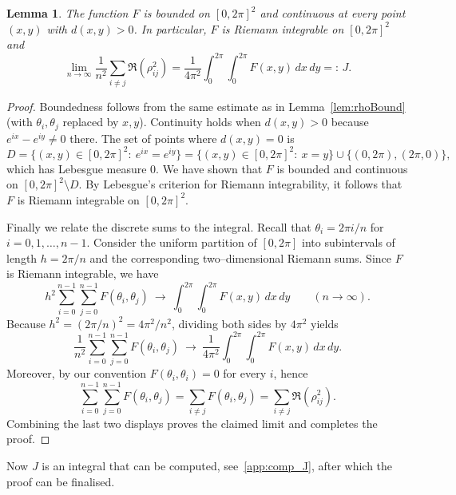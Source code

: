 \documentclass{article}
\newtheorem{lem}[thr]{Lemma}
\theoremstyle{definition}
\newcounter{row}
\begin{document}
\begin{lem}\label{lem:Riemann}
The function $F$ is bounded on $[0,2\pi]^2$ and continuous at every point $(x,y)$ with $d(x,y)>0$.
In particular, $F$ is Riemann integrable on $[0,2\pi]^2$ and
\[
\lim_{n\to\infty}\frac{1}{n^2}\sum_{i\neq j}\Re(\rho_{ij}^2)
=
\frac{1}{4\pi^2}\int_0^{2\pi}\int_0^{2\pi}F(x,y)\,dx\,dy
=:\,J.
\]
\end{lem}

\begin{proof}
Boundedness follows from the same estimate as in Lemma~\ref{lem:rhoBound}
(with $\theta_i,\theta_j$ replaced by $x,y$).
Continuity holds when $d(x,y)>0$ because $e^{ix}-e^{iy}\neq0$ there.
The set of points where $d(x,y)=0$ is
\[
D=\{(x,y)\in[0,2\pi]^2:\ e^{ix}=e^{iy}\}=\{(x,y)\in[0,2\pi]^2:\ x=y\}\cup\{(0,2\pi),(2\pi,0)\},
\]
which has Lebesgue measure $0$. We have shown that $F$ is bounded and continuous on $[0,2\pi]^2\setminus D$. By Lebesgue's criterion for Riemann integrability, it follows that $F$ is Riemann integrable on $[0,2\pi]^2$. 

Finally we relate the discrete sums to the integral.
Recall that $\theta_i=2\pi i/n$ for $i=0,1,\dots,n-1$. Consider the uniform
partition of $[0,2\pi]$ into subintervals of length $h=2\pi/n$ and the corresponding
two--dimensional Riemann sums. Since $F$ is Riemann integrable, we have
\[
h^2\sum_{i=0}^{n-1}\sum_{j=0}^{n-1}F(\theta_i,\theta_j)
\ \longrightarrow\
\int_0^{2\pi}\int_0^{2\pi}F(x,y)\,dx\,dy
\qquad (n\to\infty).
\]
Because $h^2=(2\pi/n)^2=4\pi^2/n^2$, dividing both sides by $4\pi^2$ yields
\[
\frac{1}{n^2}\sum_{i=0}^{n-1}\sum_{j=0}^{n-1}F(\theta_i,\theta_j)
\ \longrightarrow\
\frac{1}{4\pi^2}\int_0^{2\pi}\int_0^{2\pi}F(x,y)\,dx\,dy.
\]
Moreover, by our convention $F(\theta_i,\theta_i)=0$ for every $i$, hence
\[
\sum_{i=0}^{n-1}\sum_{j=0}^{n-1}F(\theta_i,\theta_j)
=
\sum_{i\neq j}F(\theta_i,\theta_j)
=
\sum_{i\neq j}\Re(\rho_{ij}^2).
\]
Combining the last two displays proves the claimed limit and completes the proof.\end{proof}

Now $J$ is an integral that can be computed, see~\cref{app:comp_J}, after which the proof can be finalised.
\end{document}
